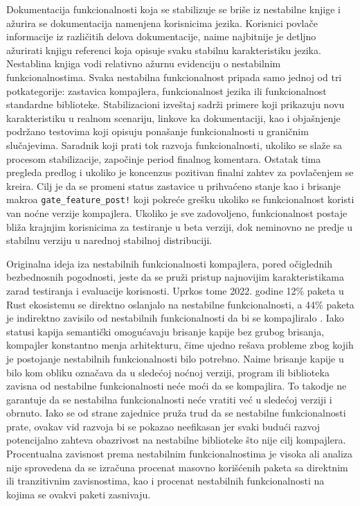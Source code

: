 \documentclass[11pt]{article}
\begin{document}
Dokumentacija funkcionalnosti koja se stabilizuje se briše iz nestabilne knjige \cite{unstable} i ažurira se 
dokumentacija namenjena korisnicima jezika. Korisnici povlače informacije iz različitih delova dokumentacije,
naime najbitnije je detljno ažurirati knjigu referenci \cite{rust-reference} koja opisuje svaku stabilnu 
karakteristiku jezika. Nestablina knjiga vodi relativno ažurnu evidenciju o nestabilnim funkcionalnostima.
Svaka nestabilna funkcionalnost pripada samo jednoj od tri potkategorije: zastavica kompajlera, funkcionalnost jezika ili
funkcionalnost standardne biblioteke. Stabilizacioni izveštaj sadrži primere koji prikazuju novu karakteristiku 
u realnom scenariju, linkove ka dokumentaciji, kao i objašnjenje podržano testovima koji opisuju ponašanje funkcionalnosti u 
graničnim slučajevima. Saradnik koji prati tok razvoja funkcionalnosti, ukoliko se slaže sa procesom 
stabilizacije, započinje period finalnog komentara. Ostatak tima pregleda predlog i ukoliko je koncenzus
pozitivan finalni zahtev za povlačenjem se kreira. Cilj je da se promeni status zastavice u prihvaćeno
stanje kao i brisanje makroa \verb|gate_feature_post!| koji pokreće grešku ukoliko se funkcionalnost koristi van noćne verzije kompajlera.
Ukoliko je sve zadovoljeno, funkcionalnost postaje bliža krajnjim korisnicima za testiranje u beta verziji, dok
neminovno ne predje u stabilnu verziju u narednoj stabilnoj distribuciji. 

\newpage

Originalna ideja iza nestabilnih funkcionalnosti kompajlera, pored očiglednih bezbednosnih pogodnosti, 
jeste da se pruži pristup najnovijim karakteristikama zarad testiranja i evaluacije korisnosti.
Uprkos tome 2022. godine 12\%  paketa u Rust ekosistemu se direktno oslanjalo na nestabilne funkcionalnosti, a 
44\% paketa je indirektno zavisilo od nestabilnih funkcionalnosti da bi se kompajliralo \cite{unstable-flags}. Iako 
statusi kapija semantički omogućavaju brisanje kapije bez grubog brisanja, kompajler konstantno menja arhitekturu, čime ujedno 
rešava probleme zbog kojih je postojanje nestabilnih funkcionalnosti bilo potrebno. Naime brisanje kapije 
u bilo kom obliku označava da u sledećoj noćnoj verziji, program ili biblioteka zavisna od nestabilne funkcionalnosti
neće moći da se kompajlira. To takodje ne garantuje da se nestabilna funkcionalnosti neće vratiti već u sledećoj
verziji i obrnuto. Iako se od strane zajednice pruža trud da se nestabilne funkcionalnosti prate, ovakav vid 
razvoja bi se pokazao neefikasan jer svaki budući razvoj potencijalno zahteva obazrivost na nestabilne 
biblioteke što nije cilj kompajlera. Procentualna zavisnost prema nestabilnim funkcionalnostima je visoka ali 
analiza nije sprovedena da se izračuna procenat masovno korišćenih paketa sa direktnim ili tranzitivnim
zavisnostima, kao i procenat nestabilnih funkcionalnosti na kojima se ovakvi paketi zasnivaju.
\end{document}
